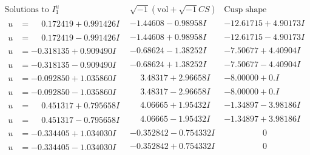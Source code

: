 \documentclass[1p]{elsarticle_modified}
\theoremstyle{definition}
\newcommand{\I}{\sqrt{-1}}
\begin{document}
$$\begin{array}{c|c|c}  
\text{Solutions to }I^u_{1}& \I (\text{vol} + \sqrt{-1}CS) & \text{Cusp shape}\\
 \hline 
\begin{aligned}
u &= \phantom{-}0.172419 + 0.991426 I\end{aligned}
 & -1.44608 - 0.98958 I & -12.61715 + 4.90173 I \\ \hline\begin{aligned}
u &= \phantom{-}0.172419 - 0.991426 I\end{aligned}
 & -1.44608 + 0.98958 I & -12.61715 - 4.90173 I \\ \hline\begin{aligned}
u &= -0.318135 + 0.909490 I\end{aligned}
 & -0.68624 - 1.38252 I & -7.50677 + 4.40904 I \\ \hline\begin{aligned}
u &= -0.318135 - 0.909490 I\end{aligned}
 & -0.68624 + 1.38252 I & -7.50677 - 4.40904 I \\ \hline\begin{aligned}
u &= -0.092850 + 1.035860 I\end{aligned}
 & \phantom{-}3.48317 + 2.96658 I & -8.00000 + 0. I\phantom{ +0.000000I} \\ \hline\begin{aligned}
u &= -0.092850 - 1.035860 I\end{aligned}
 & \phantom{-}3.48317 - 2.96658 I & -8.00000 + 0. I\phantom{ +0.000000I} \\ \hline\begin{aligned}
u &= \phantom{-}0.451317 + 0.795658 I\end{aligned}
 & \phantom{-}4.06665 + 1.95432 I & -1.34897 - 3.98186 I \\ \hline\begin{aligned}
u &= \phantom{-}0.451317 - 0.795658 I\end{aligned}
 & \phantom{-}4.06665 - 1.95432 I & -1.34897 + 3.98186 I \\ \hline\begin{aligned}
u &= -0.334405 + 1.034030 I\end{aligned}
 & -0.352842 - 0.754332 I & \phantom{-0.000000 } 0 \\ \hline\begin{aligned}
u &= -0.334405 - 1.034030 I\end{aligned}
 & -0.352842 + 0.754332 I & \phantom{-0.000000 } 0 \\ \hline\begin{aligned}

\end{aligned}
\end{array}$$
\end{document}
